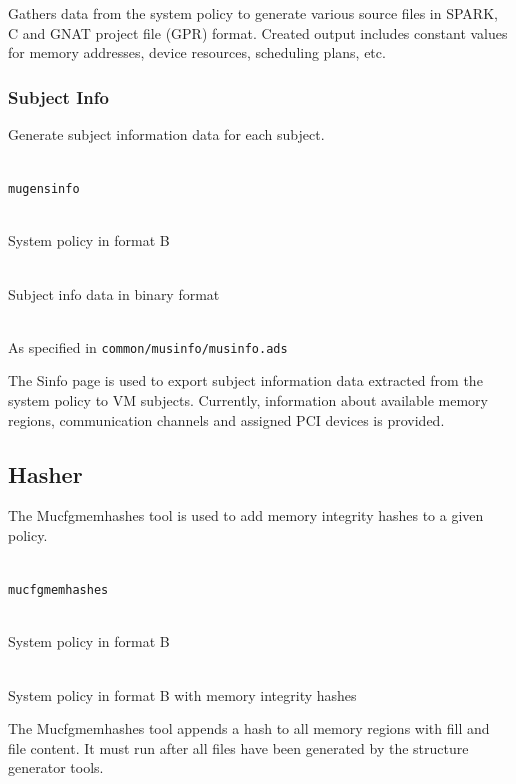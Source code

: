 \documentclass[a4paper,twoside,titlepage]{article}
\begin{document}
Gathers data from the system policy to generate various source files in SPARK,
C and GNAT project file (GPR) format. Created output includes constant values
for memory addresses, device resources, scheduling plans, etc.

\subsubsection{Subject Info}
Generate subject information data for each subject.

\begin{description} \itemsep1pt \parskip0pt
	\item[Name] \hfill \\
		\texttt{mugensinfo}
	\item[Input] \hfill \\
		System policy in format B
	\item[Output] \hfill \\
		Subject info data in binary format
	\item[Output format] \hfill \\
		As specified in \texttt{common/musinfo/musinfo.ads}
\end{description}

The Sinfo page is used to export subject information data extracted from the
system policy to VM subjects. Currently, information about available memory
regions, communication channels and assigned PCI devices is provided.

\subsection{Hasher}
The Mucfgmemhashes tool is used to add memory integrity hashes to a given
policy.

\begin{description} \itemsep1pt \parskip0pt
	\item[Name] \hfill \\
		\texttt{mucfgmemhashes}
	\item[Input] \hfill \\
		System policy in format B
	\item[Output] \hfill \\
		System policy in format B with memory integrity hashes
\end{description}

The Mucfgmemhashes tool appends a hash to all memory regions with fill and file
content. It must run after all files have been generated by the structure
generator tools.
\end{document}
